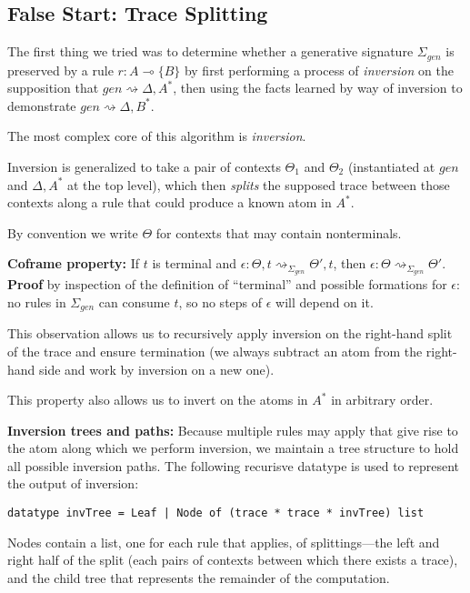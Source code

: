 \documentclass[fullpage, 11pt]{article}
\newcommand{\lolli}{\multimap}
\newcommand{\mon}[1]{\{#1\}}
\newcommand{\stepsto}{\rightsquigarrow}
\begin{document}
\subsection{False Start: Trace Splitting}

The first thing we tried was to determine whether a generative signature
$\Sigma_{gen}$ is preserved by a rule $r : A \lolli \mon{B}$ by first
performing a process of {\em inversion} on the supposition that $gen
\stepsto \Delta, A^*$, then using the facts learned by way of inversion to
demonstrate $gen \stepsto \Delta, B^*$.

The most complex core of this algorithm is {\em inversion}.

Inversion is generalized to take a pair of contexts $\Theta_1$ and
$\Theta_2$ (instantiated at $gen$ and $\Delta, A^*$ at the top level),
which then {\em splits} the supposed trace between those contexts along a
rule that could produce a known atom in $A^*$.

By convention we write $\Theta$ for contexts that may contain nonterminals.

{\bf Coframe property:} If $t$ is terminal and $\epsilon : \Theta, t
\stepsto_{\Sigma_{gen}} \Theta', t$, then $\epsilon : \Theta
\stepsto_{\Sigma_{gen}} \Theta'$. {\bf Proof} by inspection of the
definition of ``terminal'' and possible formations for $\epsilon$: no rules
in $\Sigma_{gen}$ can consume $t$, so no steps of $\epsilon$ will depend on
it.

This observation allows us to recursively apply inversion on the right-hand
split of the trace and ensure termination (we always subtract an atom from
the right-hand side and work by inversion on a new one).

This property also allows us to invert on the atoms in $A^*$ in arbitrary
order.

{\bf Inversion trees and paths:} Because multiple rules may apply that give
rise to the atom along which we perform inversion, we maintain a tree
structure to hold all possible inversion paths.
The following recurisve datatype is used to represent the output of
inversion:

\begin{verbatim}
datatype invTree = Leaf | Node of (trace * trace * invTree) list
\end{verbatim}

Nodes contain a list, one for each rule that applies, of splittings---the
left and right half of the split (each pairs of contexts between which
there exists a trace), and the child tree that represents the remainder of
the computation.
\end{document}
